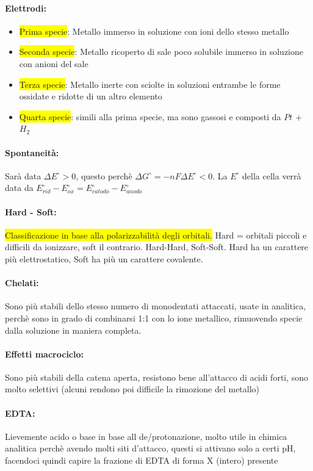 \documentclass{article}
\begin{document}
\paragraph{Elettrodi: }\begin{itemize}
	\item \colorbox{yellow}{Prima specie}: Metallo immerso in soluzione con ioni dello stesso metallo
	\item \colorbox{yellow}{Seconda specie}: Metallo ricoperto di sale poco solubile immerso in soluzione con anioni del sale 
	\item \colorbox{yellow}{Terza specie}: Metallo inerte con sciolte in soluzioni entrambe le forme ossidate e ridotte di un altro elemento
	\item \colorbox{yellow}{Quarta specie}: simili alla prima specie, ma sono gassosi e composti da $Pt$ + $H_2$
\end{itemize}

\paragraph{Spontaneità: } Sarà data $\Delta E^{\circ} > 0$, questo perchè $\Delta G^\circ = -nF\Delta E^\circ < 0$. La $E^\circ$ della cella verrà data da $E^\circ_{rid}-E^\circ_{ox} = E^\circ_{catodo}-E^\circ_{anodo} $

\paragraph{Hard - Soft: } \colorbox{yellow}{Classificazione in base alla polarizzabilità degli orbitali.} Hard = orbitali piccoli e difficili da ionizzare, soft il contrario. Hard-Hard, Soft-Soft. Hard ha un carattere più elettrostatico, Soft ha più un carattere covalente.

\paragraph{Chelati: } Sono più stabili dello stesso numero di monodentati attaccati, usate in analitica, perchè sono in grado di combinarsi 1:1 con lo ione metallico, rimuovendo specie dalla soluzione in maniera completa.
\paragraph{Effetti macrociclo: } Sono più stabili della catena aperta, resistono bene all'attacco di acidi forti, sono molto selettivi (alcuni rendono poi difficile la rimozione del metallo)
\paragraph{EDTA: } Lievemente acido o base in base all de/protonazione, molto utile in chimica analitica perchè avendo molti siti d'attacco, questi si attivano solo a certi pH, facendoci quindi capire la frazione di EDTA di forma X (intero) presente 
\end{document}
